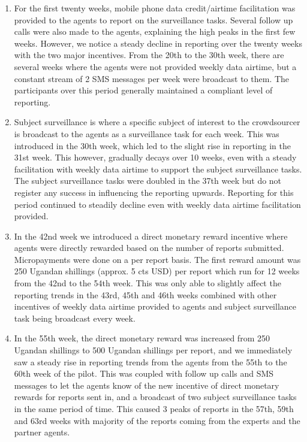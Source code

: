 \documentclass[letterpaper]{article} %
\begin{document}
\begin{enumerate}[-]
\item For the first twenty weeks, mobile phone data credit/airtime facilitation was provided to the agents to report on the surveillance tasks. Several follow up calls were also made to the agents, explaining the high peaks in the first few weeks. However, we notice a steady decline in reporting over the twenty weeks with the two major incentives. From the 20th to the 30th week, there are several weeks where the agents were not provided weekly data airtime, but a constant stream of 2 SMS messages per week were broadcast to them. The participants over this period generally maintained a compliant level of reporting.
\item Subject surveillance is where a specific subject of interest to the crowdsourcer is broadcast to the agents as a surveillance task for each week.
This was introduced in the 30th week, which led to the slight rise in reporting in the 31st week. This however, gradually decays over 10 weeks, even with a steady facilitation with weekly data airtime to support the subject surveillance tasks. The subject surveillance tasks were doubled in the 37th week but do not register any success in influencing the reporting upwards. Reporting for this period continued to steadily decline even with weekly data airtime facilitation provided.
\item In the 42nd week we introduced a direct monetary reward incentive where agents were directly rewarded based on the number of reports submitted. Micropayments were done on a per report basis. The first reward amount was 250 Ugandan shillings (approx. 5 cts USD) per report which run for 12 weeks from the 42nd to the 54th week. This was only able to slightly affect the reporting trends in the 43rd, 45th and 46th weeks combined with other incentives of weekly data airtime provided to agents and subject surveillance task being broadcast every week.
\item In the 55th week, the direct monetary reward was increased from 250 Ugandan shillings to 500 Ugandan shillings per report, and we immediately saw a steady rise in reporting trends from the agents from the 55th to the 60th week of the pilot. This was coupled with follow up calls and SMS messages to let the agents know of the new incentive of direct monetary rewards for reports sent in, and a broadcast of two subject surveillance tasks in the same period of time. This caused 3 peaks of reports in the 57th, 59th and 63rd weeks with majority of the reports coming from the experts and the partner agents.

\end{enumerate}
\end{document}

